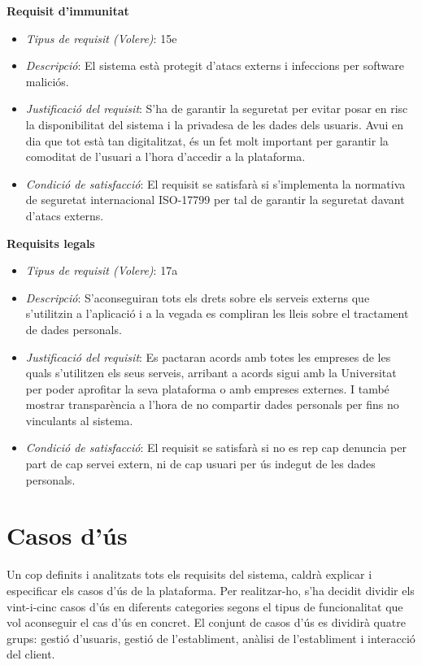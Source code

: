 \noindent\textbf{Requisit d'immunitat}
\begin{itemize}
\item \textit{Tipus de requisit (Volere)}: 15e
\item \textit{Descripció}: El sistema està protegit d'atacs externs i infeccions per software maliciós.
\item \textit{Justificació del requisit}: S'ha de garantir la seguretat per evitar posar en risc la disponibilitat del sistema i la privadesa de les dades dels usuaris. Avui en dia que tot està tan digitalitzat, és un fet molt important per garantir la comoditat de l'usuari a l'hora d'accedir a la plataforma.
\item \textit{Condició de satisfacció}: El requisit se satisfarà si s'implementa la normativa de seguretat internacional ISO-17799\cite{iso17799} per tal de garantir la seguretat davant d'atacs externs.
\end{itemize}

\noindent\textbf{Requisits legals}
\begin{itemize}
\item \textit{Tipus de requisit (Volere)}: 17a
\item \textit{Descripció}: S'aconseguiran tots els drets sobre els serveis externs que s'utilitzin a l'aplicació i a la vegada es compliran les lleis sobre el tractament de dades personals.
\item \textit{Justificació del requisit}: Es pactaran acords amb totes les empreses de les quals s'utilitzen els seus serveis, arribant a acords sigui amb la Universitat per poder aprofitar la seva plataforma o amb empreses externes. I també mostrar transparència a l'hora de no compartir dades personals per fins no vinculants al sistema.
\item \textit{Condició de satisfacció}: El requisit se satisfarà si no es rep cap denuncia per part de cap servei extern, ni de cap usuari per ús indegut de les dades personals.
\end{itemize}



\newpage
\section{Casos d'ús}

Un cop definits i analitzats tots els requisits del sistema, caldrà explicar i especificar els casos d'ús de la plataforma. Per realitzar-ho, s'ha decidit dividir els vint-i-cinc casos d'ús en diferents categories segons el tipus de funcionalitat que vol aconseguir el cas d'ús en concret. El conjunt de casos d'ús es dividirà quatre grups: gestió d'usuaris, gestió de l'establiment, anàlisi de l'establiment i interacció del client.

